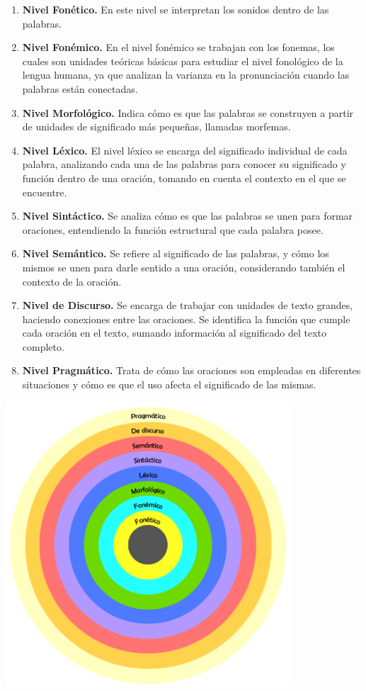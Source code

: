\begin{enumerate}[label=\alph*.]
    \item \textbf{Nivel Fonético.} En este nivel se interpretan los sonidos dentro de las palabras.
    \item \textbf{Nivel Fonémico.} En el nivel fonémico se trabajan con los fonemas, los cuales son unidades teóricas básicas para estudiar el nivel fonológico de la lengua humana, ya que analizan la varianza en la pronunciación cuando las palabras están conectadas.
    \item \textbf{Nivel Morfológico.} Indica cómo es que las palabras se construyen a partir de unidades de significado más pequeñas, llamadas morfemas.
    \item \textbf{Nivel Léxico.} El nivel léxico se encarga del significado individual de cada palabra, analizando cada una de las palabras para conocer su significado y función dentro de una oración, tomando en cuenta el contexto en el que se encuentre.
    \item \textbf{Nivel Sintáctico.} Se analiza cómo es que las palabras se unen para formar oraciones, entendiendo la función estructural que cada palabra posee.
    \item \textbf{Nivel Semántico.} Se refiere al significado de las palabras, y cómo los mismos se unen para darle sentido a una oración, considerando también el contexto de la oración.
    \item \textbf{Nivel de Discurso.} Se encarga de trabajar con unidades de texto grandes, haciendo conexiones entre las oraciones. Se identifica la función que cumple cada oración en el texto, sumando información al significado del texto completo.
    \item \textbf{Nivel Pragmático.} Trata de cómo las oraciones son empleadas en diferentes situaciones y cómo es que el uso afecta el significado de las mismas.
\end{enumerate}

\begin{center}
    \includegraphics[width=0.8\textwidth]{Images/Cap 2/Niveles_Arquitectura_PLN.png}
\end{center}

